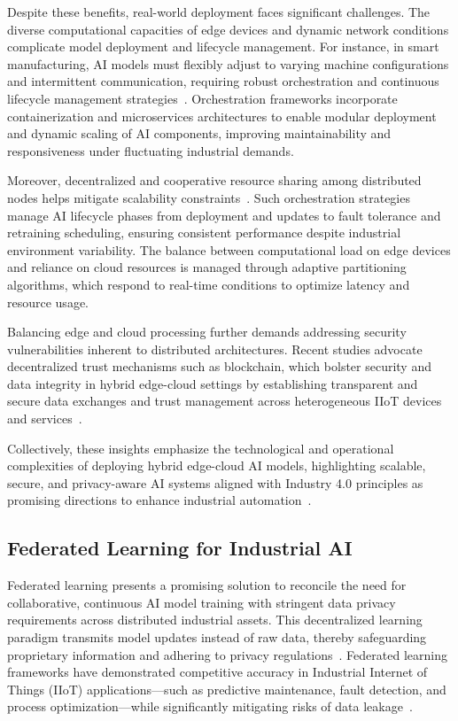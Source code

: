 \documentclass[sigconf]{acmart}
\begin{document}
Despite these benefits, real-world deployment faces significant challenges. The diverse computational capacities of edge devices and dynamic network conditions complicate model deployment and lifecycle management. For instance, in smart manufacturing, AI models must flexibly adjust to varying machine configurations and intermittent communication, requiring robust orchestration and continuous lifecycle management strategies~\cite{ref33}. Orchestration frameworks incorporate containerization and microservices architectures to enable modular deployment and dynamic scaling of AI components, improving maintainability and responsiveness under fluctuating industrial demands.

Moreover, decentralized and cooperative resource sharing among distributed nodes helps mitigate scalability constraints~\cite{ref31,ref33}. Such orchestration strategies manage AI lifecycle phases from deployment and updates to fault tolerance and retraining scheduling, ensuring consistent performance despite industrial environment variability. The balance between computational load on edge devices and reliance on cloud resources is managed through adaptive partitioning algorithms, which respond to real-time conditions to optimize latency and resource usage.

Balancing edge and cloud processing further demands addressing security vulnerabilities inherent to distributed architectures. Recent studies advocate decentralized trust mechanisms such as blockchain, which bolster security and data integrity in hybrid edge-cloud settings by establishing transparent and secure data exchanges and trust management across heterogeneous IIoT devices and services~\cite{ref31}.

Collectively, these insights emphasize the technological and operational complexities of deploying hybrid edge-cloud AI models, highlighting scalable, secure, and privacy-aware AI systems aligned with Industry 4.0 principles as promising directions to enhance industrial automation~\cite{ref33}.

\subsection{Federated Learning for Industrial AI}

Federated learning presents a promising solution to reconcile the need for collaborative, continuous AI model training with stringent data privacy requirements across distributed industrial assets. This decentralized learning paradigm transmits model updates instead of raw data, thereby safeguarding proprietary information and adhering to privacy regulations~\cite{ref32}. Federated learning frameworks have demonstrated competitive accuracy in Industrial Internet of Things (IIoT) applications—such as predictive maintenance, fault detection, and process optimization—while significantly mitigating risks of data leakage~\cite{ref34}.
\end{document}
